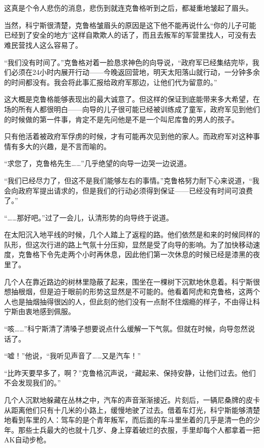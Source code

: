 

\section*{}

这真是个令人悲伤的消息，悲伤到就连克鲁格听到之后，都凝重地皱起了眉头。

当然，科宁斯很清楚，克鲁格皱眉头的原因是这下他不能再说什么“你的儿子可能已经到了安全的地方”这样自欺欺人的话了，而且去叛军的军营里找人，可没有去难民营找人这么容易了。

“我们没有时间了。”克鲁格对着一脸恳求神色的向导说，“政府军已经集结完毕，我们必须在24小时内展开行动——今晚返回营地，明天太阳落山就行动，一分钟多余的时间都没有。我会将此事汇报给政府军那边，让他们代为留意的。”

这大概是克鲁格能够表现出的最大诚意了。但这样的保证到底能带来多大希望，在场的所有人都很明白——向导的儿子很可能已经被训练成了童军，政府军见到他们的时候做的第一件事，肯定不是先问他是不是一个叫尼库鲁的男人的孩子。

只有他活着被政府军俘虏的时候，才有可能再次见到他的家人。而政府军对这种事情有多大的兴趣，是不言而喻的。

“求您了，克鲁格先生……”几乎绝望的向导一边哭一边说道。

“我们已经尽力了，但这不是我们能够左右的事情。”克鲁格努力耐下心来说道，“我会向政府军提出请求的，但是我们的行动必须得到保证——已经没有时间可浪费了。”

“……那好吧。”过了一会儿，认清形势的向导终于说道。

在太阳沉入地平线的时候，几个人踏上了返程的路。他们依然是和来的时候同样的队形，但这次行进的路上气氛十分压抑，显然是受了向导的影响。为了加快移动速度，克鲁格下令先走两个小时再休息，因此他们第一次休息的时候已经是漆黑的夜里了。

几个人在靠近路边的树林里隐蔽了起来，围坐在一棵树下沉默地休息着。科宁斯很想抽根烟，但是迫于眼前的形势这显然是不可能的。他看着阿虎和克鲁格，这两个人也是抽烟抽得很凶的人，但此刻的他们没有一点耐不住烟瘾的样子，不由得让科宁斯由衷地感到佩服。

“咳……”科宁斯清了清嗓子想要说点什么缓解一下气氛。但就在时候，向导忽然说话了。

“嘘！”他说，“我听见声音了……又是汽车！”

“比昨天要早多了，啊？”克鲁格沉声说，“藏起来、保持安静，让他们过去。他们不会发现我们的。”

几个人沉默地躲藏在丛林之中，汽车的声音渐渐接近。片刻后，一辆尼桑牌的皮卡从距离他们只有十几米的小路上，缓慢地驶了过去。借着车灯光，科宁斯能够清楚地看到车里的人：驾车的是个青年叛军，而后面的车斗里坐着的几乎是清一色的少年。那些士兵最大的也就十几岁、身上穿着破烂的衣服，手里却每个人都拿着一把AK自动步枪。

